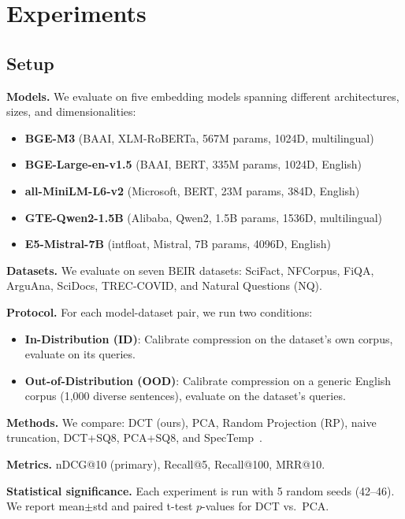 \documentclass[sigconf]{acmart}
\begin{document}
\section{Experiments}\label{sec:experiments}

\subsection{Setup}\label{sec:setup}

\textbf{Models.} We evaluate on five embedding models spanning different architectures, sizes, and dimensionalities:

\begin{itemize}
    \item \textbf{BGE-M3} (BAAI, XLM-RoBERTa, 567M params, 1024D, multilingual)
    \item \textbf{BGE-Large-en-v1.5} (BAAI, BERT, 335M params, 1024D, English)
    \item \textbf{all-MiniLM-L6-v2} (Microsoft, BERT, 23M params, 384D, English)
    \item \textbf{GTE-Qwen2-1.5B} (Alibaba, Qwen2, 1.5B params, 1536D, multilingual)
    \item \textbf{E5-Mistral-7B} (intfloat, Mistral, 7B params, 4096D, English)
\end{itemize}

\textbf{Datasets.} We evaluate on seven BEIR datasets: SciFact, NFCorpus, FiQA, ArguAna, SciDocs, TREC-COVID, and Natural Questions (NQ).

\textbf{Protocol.} For each model-dataset pair, we run two conditions:
\begin{itemize}
    \item \textbf{In-Distribution (ID)}: Calibrate compression on the dataset's own corpus, evaluate on its queries.
    \item \textbf{Out-of-Distribution (OOD)}: Calibrate compression on a generic English corpus (1,000 diverse sentences), evaluate on the dataset's queries.
\end{itemize}

\textbf{Methods.} We compare: DCT (ours), PCA, Random Projection (RP), naive truncation, DCT+SQ8, PCA+SQ8, and SpecTemp~\cite{li2026spectemp}.

\textbf{Metrics.} nDCG@10 (primary), Recall@5, Recall@100, MRR@10.

\textbf{Statistical significance.} Each experiment is run with 5 random seeds (42--46). We report mean$\pm$std and paired t-test $p$-values for DCT vs.\ PCA.
\end{document}
